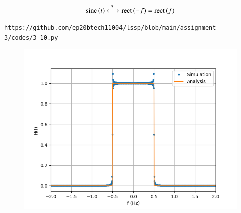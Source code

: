 \documentclass[journal,12pt,twocolumn]{IEEEtran}
\renewcommand\thesection{\arabic{section}}
\begin{document}
\begin{enumerate}[label=\thesection.\arabic*
		,ref=\thesection.\theenumi]
\begin{align}
			\text{sinc}\left(t\right)\overset{\mathcal{F}}{ \longleftrightarrow}\text{rect}\left(-f\right)=\text{rect}\left(f\right)
			\label{eq:fourier-sinc}
		\end{align}
		\begin{lstlisting}
https://github.com/ep20btech11004/lssp/blob/main/assignment-3/codes/3_10.py
		\end{lstlisting}
		\begin{figure}[!ht]
			\begin{center}
				\includegraphics[width=\columnwidth]{./figs/3_10.png}
			\end{center}
			\label{fig:}	
		\end{figure}
	\end{enumerate}
\end{document}
